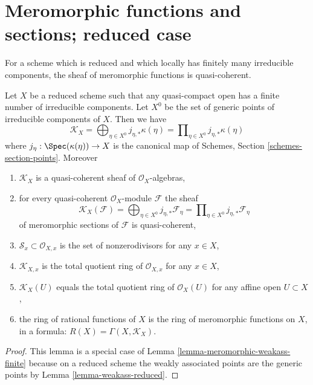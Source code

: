 \section{Meromorphic functions and sections; reduced case}
\label{section-meromorphic-reduced}

\noindent
For a scheme which is reduced and which locally has finitely many irreducible
components, the sheaf of meromorphic functions is quasi-coherent.

\begin{lemma}
\label{lemma-reduced-finite-irreducible}
Let $X$ be a reduced scheme such that any quasi-compact open
has a finite number of irreducible components. Let $X^0$ be the set
of generic points of irreducible components of $X$. Then we have
$$
\mathcal{K}_X =
\bigoplus\nolimits_{\eta \in X^0} j_{\eta, *}\kappa(\eta) =
\prod\nolimits_{\eta \in X^0} j_{\eta, *}\kappa(\eta)
$$
where $j_\eta : \Spec(\kappa(\eta)) \to X$ is the canonical map
of Schemes, Section \ref{schemes-section-points}. Moreover
\begin{enumerate}
\item $\mathcal{K}_X$ is a quasi-coherent sheaf of
$\mathcal{O}_X$-algebras,
\item for every quasi-coherent $\mathcal{O}_X$-module $\mathcal{F}$ the sheaf
$$
\mathcal{K}_X(\mathcal{F}) =
\bigoplus\nolimits_{\eta \in X^0} j_{\eta, *}\mathcal{F}_\eta =
\prod\nolimits_{\eta \in X^0} j_{\eta, *}\mathcal{F}_\eta
$$
of meromorphic sections of $\mathcal{F}$
is quasi-coherent,
\item $\mathcal{S}_x \subset \mathcal{O}_{X, x}$
is the set of nonzerodivisors for any $x \in X$,
\item $\mathcal{K}_{X, x}$ is the total quotient ring of $\mathcal{O}_{X, x}$
for any $x \in X$,
\item $\mathcal{K}_X(U)$ equals the total quotient ring of $\mathcal{O}_X(U)$
for any affine open $U \subset X$,
\item the ring of rational functions of $X$ is the ring of meromorphic
functions on $X$, in a formula: $R(X) = \Gamma(X, \mathcal{K}_X)$.
\end{enumerate}
\end{lemma}

\begin{proof}
This lemma is a special case of
Lemma \ref{lemma-meromorphic-weakass-finite}
because on a reduced scheme the weakly associated
points are the generic points by
Lemma \ref{lemma-weakass-reduced}.
\end{proof}

